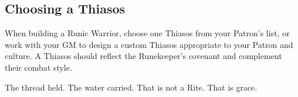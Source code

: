 \subsection*{Choosing a Thiasos}

When building a Runic Warrior, choose one Thiasos from your Patron's list, or work with your GM to design a custom Thiasos appropriate to your Patron and culture. A Thiasos should reflect the Runekeeper's covenant and complement their combat style.

The thread held. The water carried. That is not a Rite. That is grace.

